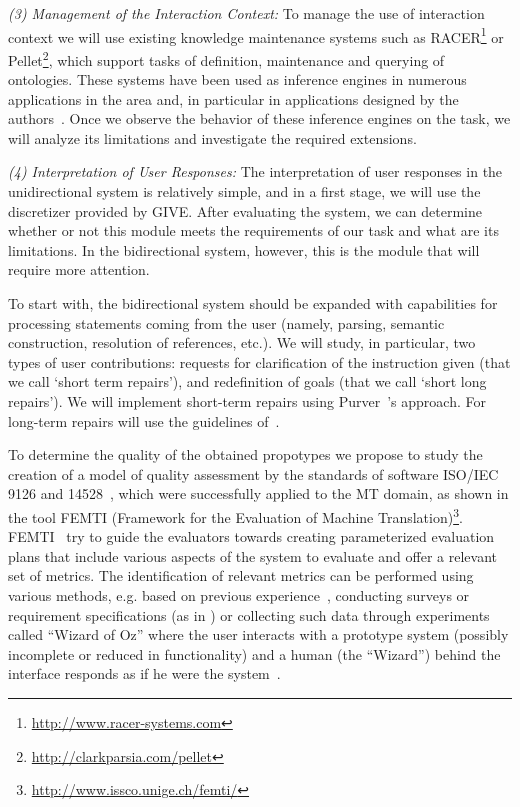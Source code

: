 \emph{(3) Management of the Interaction Context:} To manage the use of
interaction context we will use existing knowledge maintenance systems such as
RACER\footnote{\url{http://www.racer-systems.com}} or Pellet\footnote{\url{http://clarkparsia.com/pellet}}, which support tasks of
definition, maintenance and querying of ontologies. These systems have been used
as inference engines in numerous applications in
the area and, in particular
in applications designed by the authors~\cite{benotti09b}. Once we
observe the behavior of these inference engines on the task, we will analyze
its limitations and investigate the required extensions.

\emph{(4) Interpretation of User Responses:} The interpretation of user
responses in the unidirectional system is relatively simple, and in a first
stage, we will use the discretizer provided by GIVE. After evaluating the
system, we can determine whether or not this module meets the requirements of
our task and what are its limitations. In the bidirectional system, however,
this is the module that will require more attention.

To start with, the bidirectional system should be expanded with capabilities
for  processing statements coming from the user (namely, parsing, semantic
construction, resolution of references, etc.). We will study, in particular, two
types of user contributions: requests for clarification of the instruction
given (that we call `short term repairs'), and redefinition of goals (that we
call `short long repairs'). We will implement short-term repairs
using Purver~'s approach. For long-term repairs will use the
guidelines of~\cite{blaylock05a}. 
\medskip

To determine the quality of the obtained propotypes we propose to study the
creation of a model of quality assessment by the standards of software ISO/IEC
9126 and 14528~\cite{ISO9126-1,ISO14598-1}, which were successfully applied to
the MT domain, as shown in the tool FEMTI (Framework for the Evaluation of
Machine Translation)\footnote{\url{http://www.issco.unige.ch/femti/}}. FEMTI~\cite{Est2005}
try to guide the evaluators towards creating parameterized evaluation
plans that include various aspects of the system to evaluate and offer a
relevant set of metrics. The identification of relevant metrics can be performed
using various methods, e.g. based on previous
experience~\cite{paradise06,Chu2000,Litman2002}, conducting
surveys or requirement specifications (as in \cite{Lecoeuche98}) or
collecting such data through experiments called ``Wizard of Oz'' where the user
interacts with a prototype system (possibly incomplete or reduced in
functionality) and a human (the ``Wizard'') behind the interface responds as if
he were the system~\cite{Dahlback93,Fabbrizio05}.

